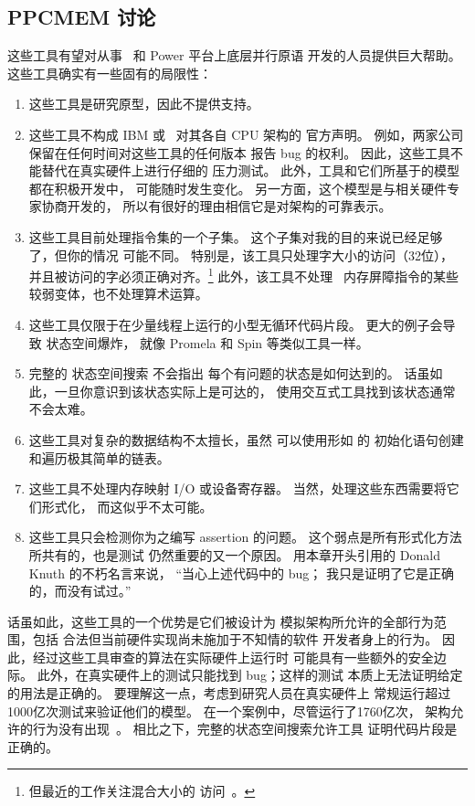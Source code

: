 \subsection{PPCMEM 讨论}
\label{sec:formal:PPCMEM Discussion}

这些工具有望对从事 \ARM\ 和 Power 平台上底层并行原语
开发的人员提供巨大帮助。
这些工具确实有一些固有的局限性：

\begin{enumerate}
\item	这些工具是研究原型，因此不提供支持。
\item	这些工具不构成 IBM 或 \ARM\ 对其各自 CPU 架构的
	官方声明。
	例如，两家公司保留在任何时间对这些工具的任何版本
	报告 bug 的权利。
	因此，这些工具不能替代在真实硬件上进行仔细的
	压力测试。
	此外，工具和它们所基于的模型都在积极开发中，
	可能随时发生变化。
	另一方面，这个模型是与相关硬件专家协商开发的，
	所以有很好的理由相信它是对架构的可靠表示。
\item	这些工具目前处理指令集的一个子集。
	这个子集对我的目的来说已经足够了，但你的情况
	可能不同。
	特别是，该工具只处理字大小的访问（32位），
	并且被访问的字必须正确对齐。\footnote{
		但最近的工作关注混合大小的
		访问~\cite{Flur:2017:MCA:3093333.3009839}。}
	此外，该工具不处理 \ARM\ 内存屏障指令的某些
	较弱变体，也不处理算术运算。
\item	这些工具仅限于在少量线程上运行的小型无循环代码片段。
	更大的例子会导致 状态空间爆炸，
	就像 Promela 和 Spin 等类似工具一样。
\item	完整的 状态空间搜索 不会指出
	每个有问题的状态是如何达到的。
	话虽如此，一旦你意识到该状态实际上是可达的，
	使用交互式工具找到该状态通常不会太难。
\item	这些工具对复杂的数据结构不太擅长，虽然
	可以使用形如  的
	初始化语句创建和遍历极其简单的链表。
\item	这些工具不处理内存映射 I/O 或设备寄存器。
	当然，处理这些东西需要将它们形式化，
	而这似乎不太可能。
\item	这些工具只会检测你为之编写 assertion 的问题。
	这个弱点是所有形式化方法所共有的，也是测试
	仍然重要的又一个原因。
	用本章开头引用的 Donald Knuth 的不朽名言来说，
	``当心上述代码中的 bug；
	我只是证明了它是正确的，而没有试过。''
\end{enumerate}

话虽如此，这些工具的一个优势是它们被设计为
模拟架构所允许的全部行为范围，包括
合法但当前硬件实现尚未施加于不知情的软件
开发者身上的行为。
因此，经过这些工具审查的算法在实际硬件上运行时
可能具有一些额外的安全边际。
此外，在真实硬件上的测试只能找到 bug；这样的测试
本质上无法证明给定的用法是正确的。
要理解这一点，考虑到研究人员在真实硬件上
常规运行超过1000亿次测试来验证他们的模型。
在一个案例中，尽管运行了1760亿次，
架构允许的行为没有出现~\cite{JadeAlglave2011ppcmem}。
相比之下，完整的状态空间搜索允许工具
证明代码片段是正确的。

